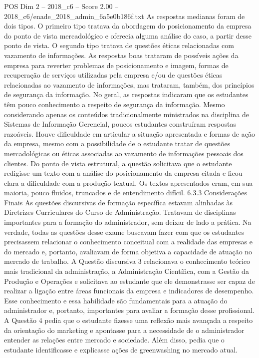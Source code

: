 \begin{textsample}{POS Dim 2 – 2018\_c6 – Score 2.00 – 2018\_c6/enade\_2018\_admin\_6a5e0b186f.txt}
As respostas medianas foram de dois tipos.
O primeiro tipo tratava da abordagem do posicionamento da empresa do ponto de vista mercadológico e oferecia alguma análise do caso, a partir desse ponto de vista.
O segundo tipo tratava de questões éticas relacionadas com vazamento de informações.
As respostas boas trataram de possíveis ações da empresa para reverter problemas de posicionamento e imagem, formas de recuperação de serviços utilizadas pela empresa e/ou de questões éticas relacionadas ao vazamento de informações, mas trataram, também, dos princípios de segurança da informação.
No geral, as respostas indicaram que os estudantes têm pouco conhecimento a respeito de segurança da informação.
Mesmo considerando apenas os conteúdos tradicionalmente ministrados na disciplina de Sistemas de Informação Gerencial, poucos estudantes construíram respostas razoáveis.
Houve dificuldade em articular a situação apresentada e formas de ação da empresa, mesmo com a possibilidade de o estudante tratar de questões mercadológicas ou éticas associadas ao vazamento de informações pessoais dos clientes.
Do ponto de vista estrutural, a questão solicitava que o estudante redigisse um texto com a análise do posicionamento da empresa citada e ficou clara a dificuldade com a produção textual.
Os textos apresentados eram, em sua maioria, pouco fluidos, truncados e de entendimento difícil. 6.3.3 Considerações Finais As questões discursivas de formação específica estavam alinhadas às Diretrizes Curriculares do Curso de Administração.
Tratavam de disciplinas importantes para a formação do administrador, sem deixar de lado a prática.
Na verdade, todas as questões desse exame buscavam fazer com que os estudantes precisassem relacionar o conhecimento conceitual com a realidade das empresas e do mercado e, portanto, avaliavam de forma objetiva a capacidade de atuação no mercado de trabalho.
A Questão discursiva 3 relacionava o conhecimento teórico mais tradicional da administração, a Administração Científica, com a Gestão da Produção e Operações e solicitava ao estudante que ele demonstrasse ser capaz de realizar a ligação entre áreas funcionais da empresa e indicadores de desempenho.
Esse conhecimento e essa habilidade são fundamentais para a atuação do administrador e, portanto, importantes para avaliar a formação desse profissional.
A Questão 4 pedia que o estudante fizesse uma reflexão mais avançada a respeito da orientação do marketing e apontasse para a necessidade de o administrador entender as relações entre mercado e sociedade.
Além disso, pedia que o estudante identificasse e explicasse ações de greenwashing no mercado atual.

\end{textsample}
